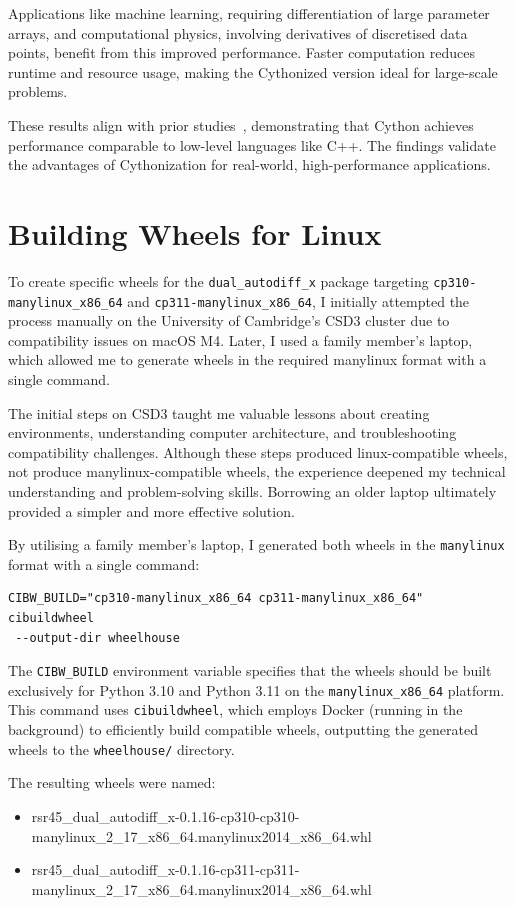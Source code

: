 \documentclass[a4paper,12pt]{article}
\begin{document}
Applications like machine learning, requiring differentiation of large parameter arrays, and computational physics, involving derivatives of discretised data points, benefit from this improved performance. Faster computation reduces runtime and resource usage, making the Cythonized version ideal for large-scale problems.

These results align with prior studies~\cite{mortensen2016cython}, demonstrating that Cython achieves performance comparable to low-level languages like C++. The findings validate the advantages of Cythonization for real-world, high-performance applications.


\section{Building Wheels for Linux}

To create specific wheels for the \texttt{dual\_autodiff\_x} package targeting \texttt{cp310-manylinux\_x86\_64} and \texttt{cp311-manylinux\_x86\_64}, I initially attempted the process manually on the University of Cambridge's CSD3 cluster due to compatibility issues on macOS M4. Later, I used a family member's laptop, which allowed me to generate wheels in the required manylinux format with a single command.

The initial steps on CSD3 taught me valuable lessons about creating environments, understanding computer architecture, and troubleshooting compatibility challenges. Although these steps produced linux-compatible wheels, not produce manylinux-compatible wheels, the experience deepened my technical understanding and problem-solving skills. Borrowing an older laptop ultimately provided a simpler and more effective solution.


By utilising a family member's laptop, I generated both wheels in the \texttt{manylinux} format with a single command:
\begin{verbatim}
CIBW_BUILD="cp310-manylinux_x86_64 cp311-manylinux_x86_64" cibuildwheel
 --output-dir wheelhouse
\end{verbatim}
The \texttt{CIBW\_BUILD} environment variable specifies that the wheels should be built exclusively for Python 3.10 and Python 3.11 on the \texttt{manylinux\_x86\_64} platform. This command uses \texttt{cibuildwheel}, which employs Docker (running in the background) to efficiently build compatible wheels, outputting the generated wheels to the \texttt{wheelhouse/} directory.

The resulting wheels were named:
\begin{itemize}
    \item rsr45\_dual\_autodiff\_x-0.1.16-cp310-cp310-manylinux\_2\_17\_x86\_64.manylinux2014\_x86\_64.whl
    \item rsr45\_dual\_autodiff\_x-0.1.16-cp311-cp311-manylinux\_2\_17\_x86\_64.manylinux2014\_x86\_64.whl
\end{itemize}
\end{document}
